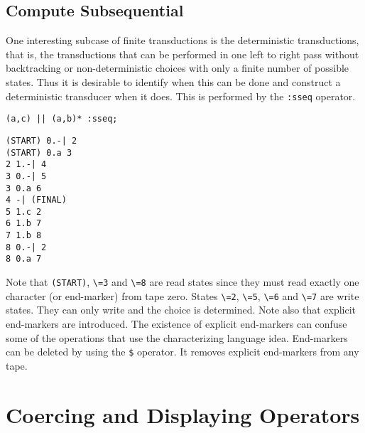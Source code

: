 \subsection{Compute Subsequential}
One interesting subcase of finite transductions is the deterministic
transductions, that is, the transductions that can be performed in one left
to right pass without backtracking or non-deterministic choices with only a
finite number of possible states.
Thus it is desirable to identify when this can be done and construct a
deterministic transducer when it does.
This is performed by the \verb#:sseq# operator.
\begin{center}\begin{minipage}[t]{3in}\begin{minipage}[t]{3in}\begin{tabbing}
\qquad \= \verb#(a,c) || (a,b)* :sseq;#
\end{tabbing}\end{minipage}\end{minipage}
\begin{minipage}[t]{1.6in}\begin{verbatim}
(START) 0.-| 2
(START) 0.a 3
2 1.-| 4
3 0.-| 5
3 0.a 6
4 -| (FINAL)
5 1.c 2
6 1.b 7
7 1.b 8
8 0.-| 2
8 0.a 7
\end{verbatim}\end{minipage}\end{center}
Note that \verb#(START)#, \verb#\=3# and \verb#\=8# are read states since they
must read exactly one character (or end-marker) from tape zero.
States \verb#\=2#, \verb#\=5#, \verb#\=6# and \verb#\=7# are write states.
They can only write and the choice is determined.
Note also that explicit end-markers are introduced.
The existence of explicit end-markers can confuse some of the operations
that use the characterizing language idea.
End-markers can be deleted by using the \verb#$# operator.
It removes explicit end-markers from any tape.
\section{Coercing and Displaying Operators}
